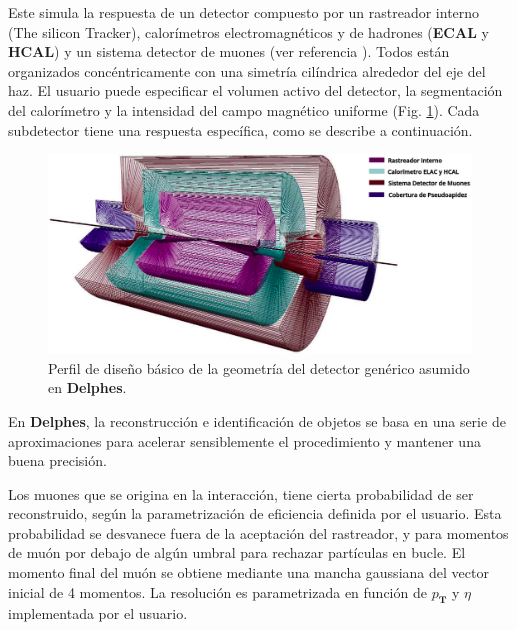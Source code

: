 Este simula la respuesta de un detector compuesto por un rastreador interno (The silicon Tracker), calorímetros electromagnéticos y de hadrones (\textbf{ECAL} y \textbf{HCAL}) y un sistema detector de muones (ver referencia \cite{de_favereau_Delphes_2014}). Todos están organizados concéntricamente con una simetría cilíndrica alrededor del eje del haz. El usuario puede especificar el volumen activo del detector, la segmentación del calorímetro y la intensidad del campo magnético uniforme (Fig. \ref{Delphes}). Cada subdetector tiene una respuesta específica, como se describe a continuación.

\begin{figure}[!h]
    \centering
    \includegraphics[width=1\textwidth]{Analisis_y_Resultados/imagenes/delphes.png}
    \caption[Perfil de diseño básico de la geometría del detector genérico asumido en  \textbf{Delphes}.]{Perfil de diseño básico de la geometría del detector genérico asumido en  \textbf{Delphes}.\footnotemark}
    \label{Delphes}
\end{figure}


En  \textbf{Delphes}, la reconstrucción e identificación de objetos se basa en una serie de aproximaciones para acelerar sensiblemente el procedimiento y mantener una buena precisión. 

Los muones que se origina en la interacción, tiene cierta probabilidad de ser reconstruido, según la parametrización de eficiencia definida por el usuario. Esta probabilidad se desvanece fuera de la aceptación del rastreador, y para momentos de muón por debajo de algún umbral para rechazar partículas en bucle. El momento final del muón se obtiene mediante una mancha gaussiana del vector inicial de 4 momentos. La resolución es parametrizada en función de $p_\mathbf{T}$ y $\eta$ implementada por el usuario.

